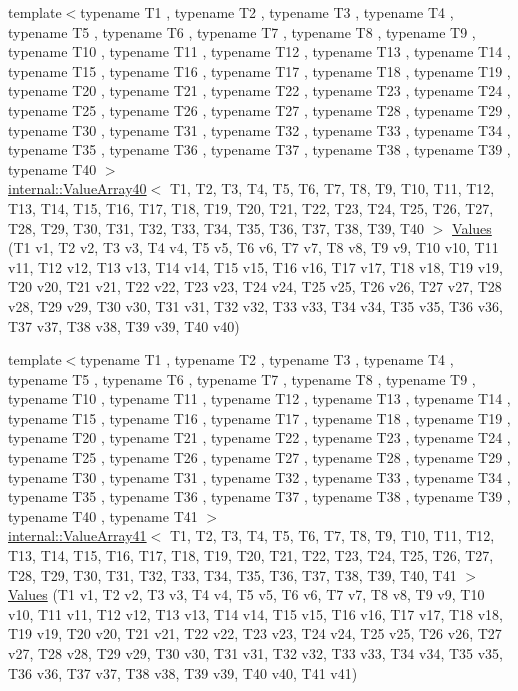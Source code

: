 \begin{DoxyCompactItemize}
\item 
{\footnotesize template$<$typename T1 , typename T2 , typename T3 , typename T4 , typename T5 , typename T6 , typename T7 , typename T8 , typename T9 , typename T10 , typename T11 , typename T12 , typename T13 , typename T14 , typename T15 , typename T16 , typename T17 , typename T18 , typename T19 , typename T20 , typename T21 , typename T22 , typename T23 , typename T24 , typename T25 , typename T26 , typename T27 , typename T28 , typename T29 , typename T30 , typename T31 , typename T32 , typename T33 , typename T34 , typename T35 , typename T36 , typename T37 , typename T38 , typename T39 , typename T40 $>$ }\\\mbox{\hyperlink{classtesting_1_1internal_1_1_value_array40}{internal\+::\+Value\+Array40}}$<$ T1, T2, T3, T4, T5, T6, T7, T8, T9, T10, T11, T12, T13, T14, T15, T16, T17, T18, T19, T20, T21, T22, T23, T24, T25, T26, T27, T28, T29, T30, T31, T32, T33, T34, T35, T36, T37, T38, T39, T40 $>$ \mbox{\hyperlink{namespacetesting_adaa8b96d44c103a70e5c4a4b3430ef4d}{Values}} (T1 v1, T2 v2, T3 v3, T4 v4, T5 v5, T6 v6, T7 v7, T8 v8, T9 v9, T10 v10, T11 v11, T12 v12, T13 v13, T14 v14, T15 v15, T16 v16, T17 v17, T18 v18, T19 v19, T20 v20, T21 v21, T22 v22, T23 v23, T24 v24, T25 v25, T26 v26, T27 v27, T28 v28, T29 v29, T30 v30, T31 v31, T32 v32, T33 v33, T34 v34, T35 v35, T36 v36, T37 v37, T38 v38, T39 v39, T40 v40)
\item 
{\footnotesize template$<$typename T1 , typename T2 , typename T3 , typename T4 , typename T5 , typename T6 , typename T7 , typename T8 , typename T9 , typename T10 , typename T11 , typename T12 , typename T13 , typename T14 , typename T15 , typename T16 , typename T17 , typename T18 , typename T19 , typename T20 , typename T21 , typename T22 , typename T23 , typename T24 , typename T25 , typename T26 , typename T27 , typename T28 , typename T29 , typename T30 , typename T31 , typename T32 , typename T33 , typename T34 , typename T35 , typename T36 , typename T37 , typename T38 , typename T39 , typename T40 , typename T41 $>$ }\\\mbox{\hyperlink{classtesting_1_1internal_1_1_value_array41}{internal\+::\+Value\+Array41}}$<$ T1, T2, T3, T4, T5, T6, T7, T8, T9, T10, T11, T12, T13, T14, T15, T16, T17, T18, T19, T20, T21, T22, T23, T24, T25, T26, T27, T28, T29, T30, T31, T32, T33, T34, T35, T36, T37, T38, T39, T40, T41 $>$ \mbox{\hyperlink{namespacetesting_a51df725741cfcc9539c48885fc2728b0}{Values}} (T1 v1, T2 v2, T3 v3, T4 v4, T5 v5, T6 v6, T7 v7, T8 v8, T9 v9, T10 v10, T11 v11, T12 v12, T13 v13, T14 v14, T15 v15, T16 v16, T17 v17, T18 v18, T19 v19, T20 v20, T21 v21, T22 v22, T23 v23, T24 v24, T25 v25, T26 v26, T27 v27, T28 v28, T29 v29, T30 v30, T31 v31, T32 v32, T33 v33, T34 v34, T35 v35, T36 v36, T37 v37, T38 v38, T39 v39, T40 v40, T41 v41)

\end{DoxyCompactItemize}
